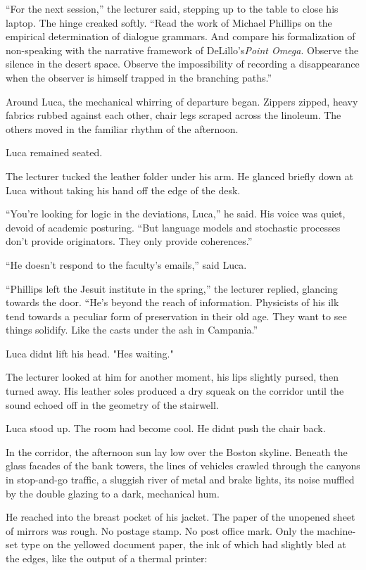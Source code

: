 \documentclass[
  ngerman,
]{article}
\begin{document}
``For the next session,'' the lecturer said, stepping up to the table to
close his laptop. The hinge creaked softly. ``Read the work of Michael
Phillips on the empirical determination of dialogue grammars. And
compare his formalization of non-speaking with the narrative framework
of DeLillo's\emph{Point Omega}. Observe the silence in the desert space.
Observe the impossibility of recording a disappearance when the observer
is himself trapped in the branching paths.''

Around Luca, the mechanical whirring of departure began. Zippers zipped,
heavy fabrics rubbed against each other, chair legs scraped across the
linoleum. The others moved in the familiar rhythm of the afternoon.

Luca remained seated.

The lecturer tucked the leather folder under his arm. He glanced briefly
down at Luca without taking his hand off the edge of the desk.

``You're looking for logic in the deviations, Luca,'' he said. His voice
was quiet, devoid of academic posturing. ``But language models and
stochastic processes don't provide originators. They only provide
coherences.''

``He doesn't respond to the faculty's emails,'' said Luca.

``Phillips left the Jesuit institute in the spring,'' the lecturer
replied, glancing towards the door. ``He's beyond the reach of
information. Physicists of his ilk tend towards a peculiar form of
preservation in their old age. They want to see things solidify. Like
the casts under the ash in Campania.''

Luca didn\textquotesingle t lift his head. "He\textquotesingle s
waiting."

The lecturer looked at him for another moment, his lips slightly pursed,
then turned away. His leather soles produced a dry squeak on the
corridor until the sound echoed off in the geometry of the stairwell.

Luca stood up. The room had become cool. He didn\textquotesingle t push
the chair back.

In the corridor, the afternoon sun lay low over the Boston skyline.
Beneath the glass facades of the bank towers, the lines of vehicles
crawled through the canyons in stop-and-go traffic, a sluggish river of
metal and brake lights, its noise muffled by the double glazing to a
dark, mechanical hum.

He reached into the breast pocket of his jacket. The paper of the
unopened sheet of mirrors was rough. No postage stamp. No post office
mark. Only the machine-set type on the yellowed document paper, the ink
of which had slightly bled at the edges, like the output of a thermal
printer:
\end{document}
